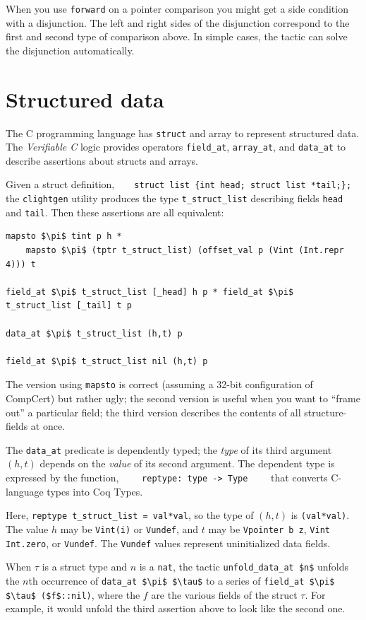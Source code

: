 \documentclass[12pt,fleqn,openany,oneside,showtrims]{memoir}
\newcommand{\ychapter}[2]{\chapter[#1]{#1 \hfill \normalsize #2}}
\begin{document}
When you use \lstinline|forward| on a pointer comparison you might get a side
condition with a disjunction. The left and right sides of the disjunction
correspond to the first and second type of comparison above. In simple cases,
the tactic can solve the disjunction automatically.

\ychapter{Structured data}{}
\label{refcard:structured}
The C programming language has \lstinline{struct} and array
to represent structured data.  The \emph{Verifiable C} logic
provides operators \lstinline{field_at},
\lstinline{array_at}, and \lstinline{data_at} to describe
assertions about structs and arrays.

Given a struct definition,~~~~\lstinline|struct list {int head; struct list *tail;};|\newline
the \lstinline{clightgen} utility produces the
type \lstinline{t_struct_list} describing fields
\lstinline{head} and \lstinline{tail}.
Then these assertions are all equivalent:

\begin{lstlisting}
mapsto $\pi$ tint p h *
    mapsto $\pi$ (tptr t_struct_list) (offset_val p (Vint (Int.repr 4))) t

field_at $\pi$ t_struct_list [_head] h p * field_at $\pi$ t_struct_list [_tail] t p

data_at $\pi$ t_struct_list (h,t) p

field_at $\pi$ t_struct_list nil (h,t) p
\end{lstlisting}
The version using \lstinline{mapsto} is correct (assuming a 32-bit
configuration of CompCert) but rather ugly;
the second version is useful when
you want to ``frame out'' a
particular field; the third version describes the contents
of all structure-fields at once.

The \lstinline{data_at} predicate is dependently typed;
the \emph{type} of its third argument $(h,t)$
depends on the \emph{value} of its second argument.
The dependent type is expressed by the
function,
$\qquad$\lstinline{reptype: type -> Type}$\qquad$
that converts C-language types into Coq Types.

Here, \lstinline{reptype t_struct_list = val*val}, so
the type of $(h,t)$ is \lstinline{(val*val)}.
The value $h$ may be \lstinline{Vint(i)} or \lstinline{Vundef},
and $t$ may be \lstinline{Vpointer b z},
\lstinline{Vint Int.zero}, or \lstinline{Vundef}.
The \lstinline{Vundef} values represent uninitialized
data fields.

When $\tau$ is a struct type and $n$ is a \lstinline{nat},
the tactic \lstinline{unfold_data_at $n$}
unfolds the $n$th occurrence of \lstinline{data_at $\pi$ $\tau$}
to a series of \lstinline{field_at $\pi$ $\tau$ ($f$::nil)},
where the $f$ are the various fields of the struct $\tau$.
For example, it would unfold the third assertion above
to look like the second one.
\end{document}
